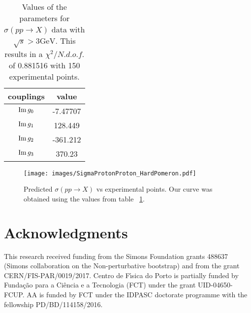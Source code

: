 \documentclass[preprint, 12pt]{elsarticle}
\begin{document}
\begin{table}[b!]
\centering
\caption{Values of the parameters for $\sigma\left(p p \rightarrow X\right)$ data with $ \sqrt{s} > 3 \text{GeV}$. This results in a $\chi^2 / {N.d.o.f.}$ of 0.881516 with 150 experimental points.}
\vspace{0.5cm}
\begin{tabular}{|c|c|}
\hline
couplings   & value \\
\hline
${\rm Im} \, g_0$  & -7.47707\\ 
\hline
${\rm Im} \, g_1$  & 128.449 \\ 
\hline
${\rm Im} \, g_2$  & -361.212  \\
\hline
${\rm Im} \, g_3$  & 370.23 \\ 
\hline
\end{tabular}
\label{table:SigmaPP_best_fit}
\end{table}

\begin{figure}[!h]
\center
\texttt{[image: images/SigmaProtonProton\_HardPomeron.pdf]} 
\caption{Predicted $\sigma\left(p p \rightarrow X\right)$ vs experimental points. Our curve was obtained using the values from table ~\ref{table:SigmaPP_best_fit}.}
\label{fig:SigmaPP_best_fit}
\end{figure}

\section{Acknowledgments}

This research received funding from the Simons Foundation grants 488637  (Simons collaboration on the Non-perturbative bootstrap)
and from the  grant CERN/FIS-PAR/0019/2017. 
Centro de F\'\i sica do Porto is partially funded by Funda\c c\~ao para a Ci\^encia e a Tecnologia (FCT) under the grant
UID-04650-FCUP.
 AA is funded by FCT under the IDPASC doctorate programme with the fellowship  PD/BD/114158/2016.



\end{document}
